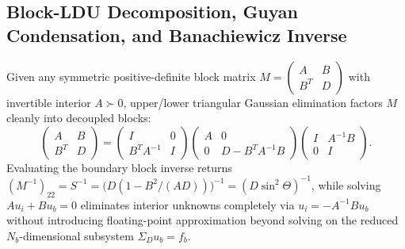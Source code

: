 \documentclass[10pt]{article}
\renewcommand{\_}{\OrigUnderscore\hspace{0pt}}
\numberwithin{equation}{section}
\begin{document}
\subsection{Block-LDU Decomposition, Guyan Condensation, and Banachiewicz Inverse}\label{subsec:app-ldu-proof}
Given any symmetric positive-definite block matrix $M = \begin{pmatrix} A & B \\ B^T & D \end{pmatrix}$ with invertible interior $A \succ 0$, upper/lower triangular Gaussian elimination factors $M$ cleanly into decoupled blocks:
\begin{equation}\label{eq:app-block-ldu}
\begin{pmatrix} A & B \\ B^T & D \end{pmatrix}
= \begin{pmatrix} I & 0 \\ B^T A^{-1} & I \end{pmatrix}
\begin{pmatrix} A & 0 \\ 0 & D - B^T A^{-1} B \end{pmatrix}
\begin{pmatrix} I & A^{-1}B \\ 0 & I \end{pmatrix}.
\end{equation}
Evaluating the boundary block inverse returns $(M^{-1})_{22} = S^{-1} = \bigl(D(1 - B^2/(AD))\bigr)^{-1} = (D\sin^2\Theta)^{-1}$, while solving $A u_i + B u_b = 0$ eliminates interior unknowns completely via $u_i = -A^{-1} B u_b$ without introducing floating-point approximation beyond solving on the reduced $N_b$-dimensional subsystem $\Sigma_D u_b = f_b$.
\end{document}
